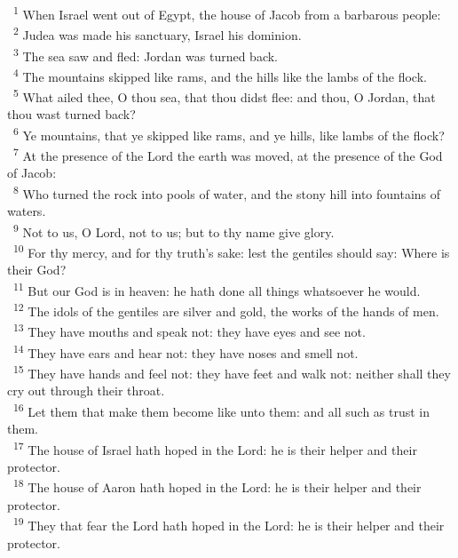 \documentclass[a5paper,12pt]{article}
\begin{document}
\begin{multicols*}{2}
~\textsuperscript{1} When Israel went out of Egypt, the house of Jacob from a barbarous people:\\
~\textsuperscript{2} Judea was made his sanctuary, Israel his dominion.\\
~\textsuperscript{3} The sea saw and fled: Jordan was turned back.\\
~\textsuperscript{4} The mountains skipped like rams, and the hills like the lambs of the flock.\\
~\textsuperscript{5} What ailed thee, O thou sea, that thou didst flee: and thou, O Jordan, that thou wast turned back?\\
~\textsuperscript{6} Ye mountains, that ye skipped like rams, and ye hills, like lambs of the flock?\\
~\textsuperscript{7} At the presence of the Lord the earth was moved, at the presence of the God of Jacob:\\
~\textsuperscript{8} Who turned the rock into pools of water, and the stony hill into fountains of waters.\\
~\textsuperscript{9} Not to us, O Lord, not to us; but to thy name give glory.\\
~\textsuperscript{10} For thy mercy, and for thy truth's sake: lest the gentiles should say: Where is their God?\\
~\textsuperscript{11} But our God is in heaven: he hath done all things whatsoever he would.\\
~\textsuperscript{12} The idols of the gentiles are silver and gold, the works of the hands of men.\\
~\textsuperscript{13} They have mouths and speak not: they have eyes and see not.\\
~\textsuperscript{14} They have ears and hear not: they have noses and smell not.\\
~\textsuperscript{15} They have hands and feel not: they have feet and walk not: neither shall they cry out through their throat.\\
~\textsuperscript{16} Let them that make them become like unto them: and all such as trust in them.\\
~\textsuperscript{17} The house of Israel hath hoped in the Lord: he is their helper and their protector.\\
~\textsuperscript{18} The house of Aaron hath hoped in the Lord: he is their helper and their protector.\\
~\textsuperscript{19} They that fear the Lord hath hoped in the Lord: he is their helper and their protector.\\

\end{multicols*}
\end{document}

